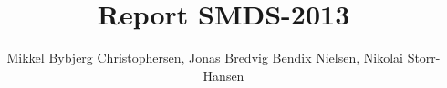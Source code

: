 \documentclass[]{report}
\title{Report SMDS-2013}
\author{Mikkel Bybjerg Christophersen, Jonas Bredvig Bendix Nielsen, Nikolai Storr-Hansen}
\begin{document}
\maketitle

\begin{abstract}
\end{abstract}
\end{document}

